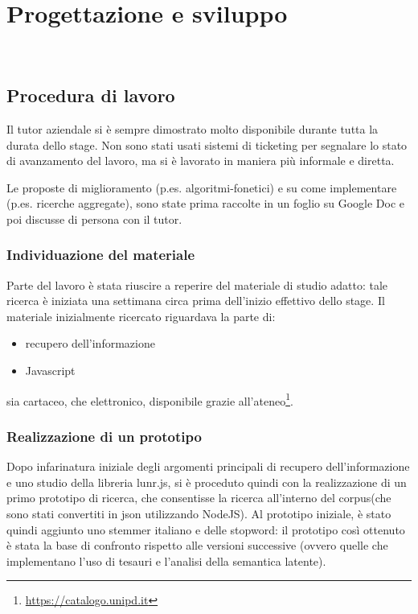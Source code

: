 
\chapter{Progettazione e sviluppo}
\label{cap:progettazione-sviluppo}

\\

\section{Procedura di lavoro}
Il tutor aziendale si è sempre dimostrato molto disponibile durante tutta la durata dello stage. Non sono stati usati sistemi di ticketing per segnalare lo stato di avanzamento del lavoro, ma si è lavorato in maniera più informale e diretta. 

Le proposte di miglioramento (p.es. \gls{algoritmi-fonetici}) e  su come implementare (p.es. ricerche aggregate), sono state prima raccolte in un foglio su Google Doc e poi discusse di persona con il tutor.

\subsection{Individuazione del materiale}
Parte del lavoro è stata riuscire a reperire del materiale di studio adatto: tale ricerca è iniziata una settimana circa prima dell'inizio effettivo dello stage. Il materiale inizialmente ricercato riguardava la parte di:
\begin{itemize}
    \item recupero dell'informazione
    \item Javascript
\end{itemize}
sia cartaceo, che elettronico, disponibile grazie all'ateneo\footnote{\url{https://catalogo.unipd.it}}. 

\subsection{Realizzazione di un prototipo}
Dopo infarinatura iniziale degli argomenti principali di recupero dell'informazione e uno studio della libreria lunr.js, si è proceduto quindi con la realizzazione di un primo prototipo di ricerca, che consentisse la ricerca all'interno del \gls{corpus}(che sono stati convertiti in \gls{json}\glsfirstoccur{} utilizzando NodeJS). 
Al prototipo iniziale, è stato quindi aggiunto uno stemmer italiano e delle stopword: il prototipo così ottenuto è stata la base di confronto rispetto alle versioni successive (ovvero quelle che implementano l'uso di tesauri e l'analisi della semantica latente). 

